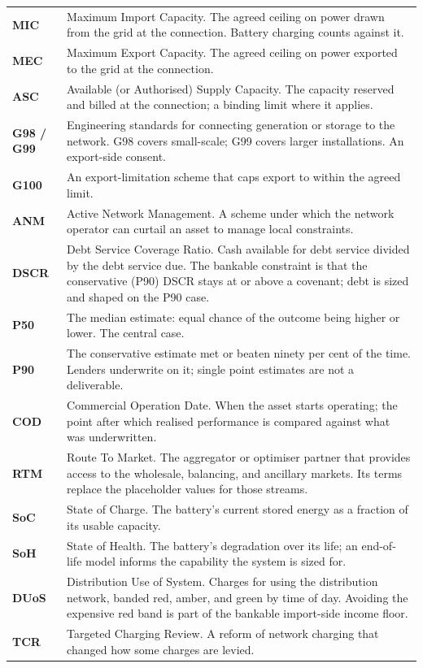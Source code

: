 \begin{longtable}{@{}>{\bfseries}p{2.4cm} p{12.3cm}@{}}
MIC & Maximum Import Capacity. The agreed ceiling on power drawn from the grid at the connection. Battery charging counts against it. \\
MEC & Maximum Export Capacity. The agreed ceiling on power exported to the grid at the connection. \\
ASC & Available (or Authorised) Supply Capacity. The capacity reserved and billed at the connection; a binding limit where it applies. \\
G98 / G99 & Engineering standards for connecting generation or storage to the network. G98 covers small-scale; G99 covers larger installations. An export-side consent. \\
G100 & An export-limitation scheme that caps export to within the agreed limit. \\
ANM & Active Network Management. A scheme under which the network operator can curtail an asset to manage local constraints. \\
DSCR & Debt Service Coverage Ratio. Cash available for debt service divided by the debt service due. The bankable constraint is that the conservative (P90) DSCR stays at or above a covenant; debt is sized and shaped on the P90 case. \\
P50 & The median estimate: equal chance of the outcome being higher or lower. The central case. \\
P90 & The conservative estimate met or beaten ninety per cent of the time. Lenders underwrite on it; single point estimates are not a deliverable. \\
COD & Commercial Operation Date. When the asset starts operating; the point after which realised performance is compared against what was underwritten. \\
RTM & Route To Market. The aggregator or optimiser partner that provides access to the wholesale, balancing, and ancillary markets. Its terms replace the placeholder values for those streams. \\
SoC & State of Charge. The battery's current stored energy as a fraction of its usable capacity. \\
SoH & State of Health. The battery's degradation over its life; an end-of-life model informs the capability the system is sized for. \\
DUoS & Distribution Use of System. Charges for using the distribution network, banded red, amber, and green by time of day. Avoiding the expensive red band is part of the bankable import-side income floor. \\
TCR & Targeted Charging Review. A reform of network charging that changed how some charges are levied. \\

\end{longtable}
